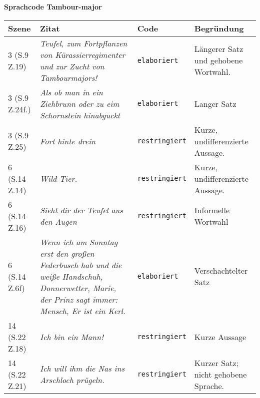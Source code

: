\documentclass[12pt, a4paper]{report}
\begin{document}
	\newcommand{\elabo}[0]{\texttt{elaboriert}}
	\newcommand{\restr}[0]{\texttt{restringiert}}
	
	\noindent
	\Large \textbf{Sprachcode Tambour-major} \\[1cm]
	\normalsize
	\begin{tabularx}{\textwidth}{|X|X|X|X|}
		\hline
		\textbf{Szene} & \textbf{Zitat} & \textbf{Code} & \textbf{Begründung} \\
		\hline
		3 (S.9 Z.19) & \textit{Teufel, zum Fortpflanzen von Kürassierregimenter und zur Zucht von Tambourmajors!}& \elabo & Längerer Satz und gehobene Wortwahl. \\
		\hline
		3 (S.9 Z.24f.) & \textit{Als ob man in ein Ziehbrunn oder zu eim Schornstein hinabguckt} & \elabo & Langer Satz \\
		\hline
		3 (S.9 Z.25)& \textit{Fort hinte drein} & \restr & Kurze, undifferenzierte Aussage. \\
		\hline
		6 (S.14 Z.14)& \textit{Wild Tier.} & \restr & Kurze, undifferenzierte Aussage. \\
		\hline
		6 (S.14 Z.16)& \textit{Sieht dir der Teufel aus den Augen} & \restr & Informelle Wortwahl \\
		\hline
		6 (S.14 Z.6f)& \textit{Wenn ich am Sonntag erst den großen Federbusch hab und die weiße Handschuh, Donnerwetter, Marie, der Prinz sagt immer: Mensch, Er ist ein Kerl.} &\elabo & Verschachtelter Satz\\
		\hline
		14 (S.22 Z.18)& \textit{Ich bin ein Mann!} & \restr & Kurze Aussage \\
		\hline
		14 (S.22 Z.21)& \textit{Ich will ihm die Nas ins Arschloch prügeln.} & \restr & Kurzer Satz; nicht gehobene Sprache. \\
		\hline
		
		\hline
	\end{tabularx}
\end{document}
